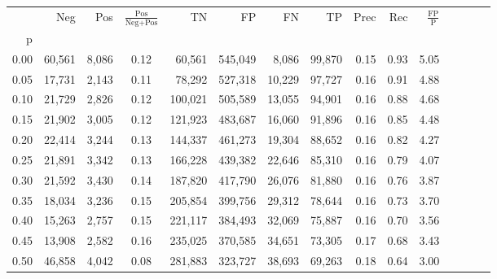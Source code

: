 \begin{tabular}{rrrcrrrrrrrrrrr}
\toprule
{} &      Neg &     Pos & $\frac{\text{Pos}}{\text{Neg}+\text{Pos}}$ &       TN &       FP &       FN &      TP &  Prec &   Rec & $\frac{\text{FP}}{\text{P}}$ \\
p    &          &         &                                            &          &          &          &         &       &       &                              \\
\midrule
0.00 &   60,561 &   8,086 &                                       0.12 &   60,561 &  545,049 &    8,086 &  99,870 &  0.15 &  0.93 &                         5.05 \\
0.05 &   17,731 &   2,143 &                                       0.11 &   78,292 &  527,318 &   10,229 &  97,727 &  0.16 &  0.91 &                         4.88 \\
0.10 &   21,729 &   2,826 &                                       0.12 &  100,021 &  505,589 &   13,055 &  94,901 &  0.16 &  0.88 &                         4.68 \\
0.15 &   21,902 &   3,005 &                                       0.12 &  121,923 &  483,687 &   16,060 &  91,896 &  0.16 &  0.85 &                         4.48 \\
0.20 &   22,414 &   3,244 &                                       0.13 &  144,337 &  461,273 &   19,304 &  88,652 &  0.16 &  0.82 &                         4.27 \\
0.25 &   21,891 &   3,342 &                                       0.13 &  166,228 &  439,382 &   22,646 &  85,310 &  0.16 &  0.79 &                         4.07 \\
0.30 &   21,592 &   3,430 &                                       0.14 &  187,820 &  417,790 &   26,076 &  81,880 &  0.16 &  0.76 &                         3.87 \\
0.35 &   18,034 &   3,236 &                                       0.15 &  205,854 &  399,756 &   29,312 &  78,644 &  0.16 &  0.73 &                         3.70 \\
0.40 &   15,263 &   2,757 &                                       0.15 &  221,117 &  384,493 &   32,069 &  75,887 &  0.16 &  0.70 &                         3.56 \\
0.45 &   13,908 &   2,582 &                                       0.16 &  235,025 &  370,585 &   34,651 &  73,305 &  0.17 &  0.68 &                         3.43 \\
0.50 &   46,858 &   4,042 &                                       0.08 &  281,883 &  323,727 &   38,693 &  69,263 &  0.18 &  0.64 &                         3.00 \\

\end{tabular}
